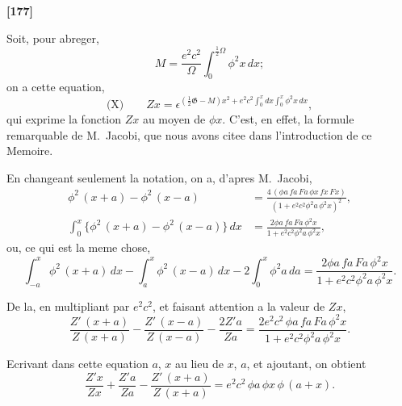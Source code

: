 \documentclass[11pt,a4paper]{book}
\begin{document}
\textbf{[177]}

Soit, pour abreger,
\begin{equation}
M = \frac{e^2 c^2}{\Omega} \int_0^{\frac{1}{2}\Omega} \phi^2 x\, dx; \tag{45}
\end{equation}
on a cette equation,
\begin{equation*}
\text{(X)}\qquad Zx = \epsilon^{(\frac{1}{2}\mathfrak{G} - M)x^2 + e^2 c^2 \int_0^x dx \int_0^x \phi^2 x\, dx},
\end{equation*}
qui exprime la fonction $Zx$ au moyen de $\phi x$. C'est, en effet, la formule remarquable
de M.~Jacobi, que nous avons citee dans l'introduction de ce Memoire.

En changeant seulement la notation, on a, d'apres M.~Jacobi,
\begin{align}
\phi^2\, (x+a) - \phi^2\, (x-a) &= \frac{4\, (\phi a\, fa\, Fa\, \phi x\, fx\, Fx)}{(1 + e^2 c^2 \phi^2 a\, \phi^2 x)^2}, \tag{46}\\
\int_0^x \{\phi^2\, (x+a) - \phi^2\, (x-a)\}\, dx &= \frac{2\phi a\, fa\, Fa\, \phi^2 x}{1 + e^2 c^2 \phi^2 a\, \phi^2 x}, \tag{47}
\end{align}
ou, ce qui est la meme chose,
\begin{equation}
\int_{-a}^{x} \phi^2\, (x+a)\, dx - \int_a^x \phi^2\, (x-a)\, dx - 2\int_0^x \phi^2 a\, da = \frac{2\phi a\, fa\, Fa\, \phi^2 x}{1 + e^2 c^2 \phi^2 a\, \phi^2 x}. \tag{48}
\end{equation}

De la, en multipliant par $e^2 c^2$, et faisant attention a la valeur de $Zx$,
\begin{equation}
\frac{Z'\, (x+a)}{Z\, (x+a)} - \frac{Z'\, (x-a)}{Z\, (x-a)} - \frac{2Z'a}{Za} = \frac{2e^2 c^2\, \phi a\, fa\, Fa\, \phi^2 x}{1 + e^2 c^2 \phi^2 a\, \phi^2 x}. \tag{49}
\end{equation}

Ecrivant dans cette equation $a$, $x$ au lieu de $x$, $a$, et ajoutant, on obtient
\begin{equation}
\frac{Z'x}{Zx} + \frac{Z'a}{Za} - \frac{Z'\, (x+a)}{Z\, (x+a)} = e^2 c^2\, \phi a\, \phi x\, \phi\, (a+x). \tag{50}
\end{equation}
\end{document}
